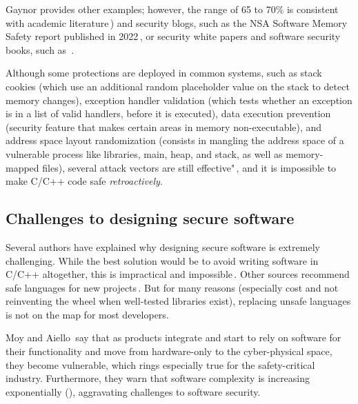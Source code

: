 \documentclass[nomenclature, english, bibtex]{kththesis}
\begin{document}
Gaynor provides other examples; however, the range of 65 to 70\% is consistent with academic literature\,\cite{mergendahl_cross-language_2022,scherer_engineering_2021, li_improving_2014}) and security blogs, such as the \gls{NSA} Software Memory Safety report published in 2022\,\cite{noauthor_nsa_2022}, or security white papers and software security books, such as~\cite{chapman_adacore_2018}.

Although some protections are deployed in common systems, such as stack cookies (which use an additional random placeholder value on the stack to detect memory changes), exception handler validation (which tests whether an exception is in a list
of valid handlers, before it is executed), data execution prevention (security feature that makes certain areas in memory non-executable), and address space layout randomization (consists in mangling the address space of a vulnerable process like libraries, main, heap, and stack, as well as memory-mapped files), several attack vectors are still effective"\,\cite{szekeres_sok_2013}, and it is impossible to make C/C++ code safe \emph{retroactively}. 

\subsection{Challenges to designing secure software}

Several authors have explained why designing secure software is extremely challenging. While the best solution would be to avoid writing software in C/C++ altogether, this is impractical and impossible\,\cite{szekeres_sok_2013}. Other sources recommend safe languages for new projects\,\cite{scherer_engineering_2021}. But for many reasons (especially cost and not reinventing the wheel when well-tested libraries exist), replacing unsafe languages is not on the map for most developers.

Moy and Aiello\,\cite{moy_when_2020} say that as products integrate and start to rely on software for their functionality and move from hardware-only to the cyber-physical space, they become vulnerable, which rings especially true for the \gls{safety-critical} industry. Furthermore, they warn that software complexity is increasing exponentially (\cite{moy_when_2020}), aggravating challenges to software security.
\end{document}
